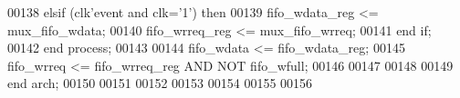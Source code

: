 \begin{DoxyCode}
00138    \textcolor{keywordflow}{elsif} \textcolor{vhdlchar}{(}\textcolor{vhdlchar}{clk}\textcolor{vhdlchar}{'}\textcolor{vhdlkeyword}{event} \textcolor{keywordflow}{and} \textcolor{vhdlchar}{clk}\textcolor{vhdlchar}{=}\textcolor{vhdlchar}{'}\textcolor{vhdllogic}{}\textcolor{vhdllogic}{1}\textcolor{vhdlchar}{'}\textcolor{vhdlchar}{)} \textcolor{keywordflow}{then} 
00139       \textcolor{vhdlchar}{fifo_wdata_reg} \textcolor{vhdlchar}{<=} \textcolor{vhdlchar}{mux_fifo_wdata};
00140       \textcolor{vhdlchar}{fifo_wrreq_reg} \textcolor{vhdlchar}{<=} \textcolor{vhdlchar}{mux_fifo_wrreq};
00141    \textcolor{keywordflow}{end} \textcolor{keywordflow}{if};
00142 \textcolor{keywordflow}{end} \textcolor{keywordflow}{process}; 
00143 
00144 \textcolor{vhdlchar}{fifo_wdata} \textcolor{vhdlchar}{<=} \textcolor{vhdlchar}{fifo_wdata_reg};
00145 \textcolor{vhdlchar}{fifo_wrreq} \textcolor{vhdlchar}{<=} \textcolor{vhdlchar}{fifo_wrreq_reg} \textcolor{keywordflow}{AND} \textcolor{keywordflow}{NOT} \textcolor{vhdlchar}{fifo_wfull};
00146         
00147         
00148 
00149 \textcolor{keywordflow}{end} \textcolor{vhdlchar}{arch};   
00150 
00151 
00152 
00153 
00154 
00155 
00156 
\end{DoxyCode}
